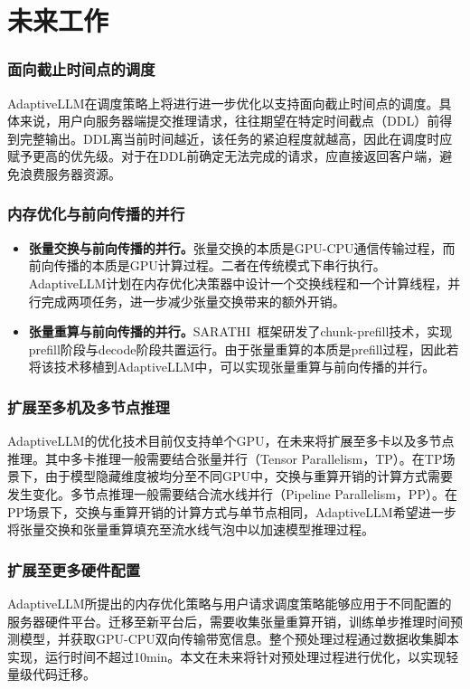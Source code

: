 \section{未来工作}

\subsubsection{面向截止时间点的调度}

AdaptiveLLM在调度策略上将进行进一步优化以支持面向截止时间点的调度。具体来说，用户向服务器端提交推理请求，往往期望在特定时间截点（DDL）前得到完整输出。DDL离当前时间越近，该任务的紧迫程度就越高，因此在调度时应赋予更高的优先级。对于在DDL前确定无法完成的请求，应直接返回客户端，避免浪费服务器资源。

\subsubsection{内存优化与前向传播的并行}

\begin{itemize}

    \item \textbf{张量交换与前向传播的并行。}张量交换的本质是GPU-CPU通信传输过程，而前向传播的本质是GPU计算过程。二者在传统模式下串行执行。AdaptiveLLM计划在内存优化决策器中设计一个交换线程和一个计算线程，并行完成两项任务，进一步减少张量交换带来的额外开销。

    \item \textbf{张量重算与前向传播的并行。}SARATHI~\cite{SARATHI}框架研发了chunk-prefill技术，实现prefill阶段与decode阶段共置运行。由于张量重算的本质是prefill过程，因此若将该技术移植到AdaptiveLLM中，可以实现张量重算与前向传播的并行。

\end{itemize}

\subsubsection{扩展至多机及多节点推理} 

AdaptiveLLM的优化技术目前仅支持单个GPU，在未来将扩展至多卡以及多节点推理。其中多卡推理一般需要结合张量并行（Tensor Parallelism，TP）。在TP场景下，由于模型隐藏维度被均分至不同GPU中，交换与重算开销的计算方式需要发生变化。多节点推理一般需要结合流水线并行（Pipeline Parallelism，PP）。在PP场景下，交换与重算开销的计算方式与单节点相同，AdaptiveLLM希望进一步将张量交换和张量重算填充至流水线气泡中以加速模型推理过程。

\subsubsection{扩展至更多硬件配置}

AdaptiveLLM所提出的内存优化策略与用户请求调度策略能够应用于不同配置的服务器硬件平台。迁移至新平台后，需要收集张量重算开销，训练单步推理时间预测模型，并获取GPU-CPU双向传输带宽信息。整个预处理过程通过数据收集脚本实现，运行时间不超过10min。本文在未来将针对预处理过程进行优化，以实现轻量级代码迁移。

